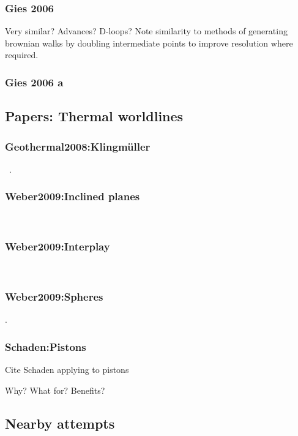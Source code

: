 \subsubsection{Gies 2006}
\cite{Gies2006}

Very similar?  Advances?  
D-loops?  Note similarity to methods of generating brownian walks by doubling intermediate points to improve resolution where required.  

\subsubsection{Gies 2006 a}
\cite{Gies2006a}

\subsection{Papers: Thermal worldlines}

\subsubsection{Geothermal2008:Klingm\"uller}
~\cite{Klingmueller2008}.  
\subsubsection{Weber2009:Inclined planes}
~\cite{Weber2009}
\subsubsection{Weber2009:Interplay}
~\cite{Weber2010}
\subsubsection{Weber2009:Spheres}
\cite{Weber2010a}.  

\subsubsection{Schaden:Pistons}

Cite Schaden applying to pistons\cite{Schaden2009}

Why?  What for?  Benefits?

\subsection{Nearby attempts}

\cite{Aehlig2011}

\cite{Maggs2006, Pasquali2008}

